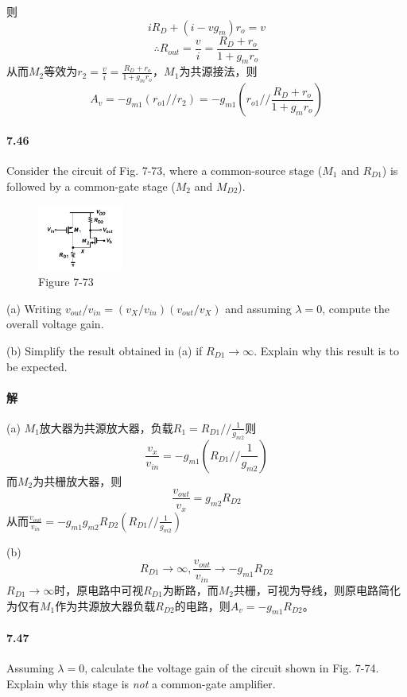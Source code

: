 \documentclass[hyperref, UTF8]{ctexart}
\newcommand{\under}[1]{\frac{1}{#1}}
\begin{document}
    则$$iR_D + (i - vg_m) r_o = v$$
    $$\therefore R_{out}=\frac{v}{i}=\frac{R_D+r_o}{1+g_mr_o}$$
    从而$M_2$等效为$r_2=\frac{v}{i}=\frac{R_D+r_o}{1+g_mr_o}$，$M_1$为共源接法，则
    $$A_v = -g_{m1}(r_{o1}//r_2) = -g_{m1}(r_{o1}//\frac{R_D+r_o}{1+g_mr_o})$$

\paragraph{7.46}\label{7.46}
    Consider the circuit of Fig. 7-73, where a common-source stage ($M_1$ and $R_{D1}$) is followed by a common-gate stage ($M_2$ and $M_{D2}$).

    \begin{figure}[!htb]
        \centering
        \includegraphics[width=0.249\textwidth]{p7-73.png}
        \caption*{Figure 7-73}
    \end{figure}
        
    (a) Writing $v_{out}/v_{in} = (v_X / v_{in})(v_{out}/v_X)$ and assuming $\lambda=0$, compute the overall voltage gain.

    (b) Simplify the result obtained in (a) if $R_{D1} \rightarrow \infty$. Explain why this result is to be expected.

\paragraph{解}

    (a) $M_1$放大器为共源放大器，负载$R_1=R_{D1}//\under{g_{m2}}$则
    $$\frac{v_x}{v_{in}}=-g_{m1}(R_{D1}//\under{g_{m2}})$$
    而$M_2$为共栅放大器，则
    $$\frac{v_{out}}{v_x}=g_{m2}R_{D2}$$
    从而$\frac{v_{out}}{v_{in}}=-g_{m1}g_{m2}R_{D2}(R_{D1}//\under{g_{m2}})$

    (b) $$R_{D1} \rightarrow \infty, \frac{v_{out}}{v_{in}} \rightarrow -g_{m1}R_{D2}$$
    $R_{D1} \rightarrow \infty$时，原电路中可视$R_{D1}$为断路，而$M_2$共栅，可视为导线，则原电路简化为仅有$M_1$作为共源放大器负载$R_{D2}$的电路，则$A_v = -g_{m1}R_{D2}$。

\paragraph{7.47} \label{7.47}
    Assuming $\lambda=0$, calculate the voltage gain of the circuit shown in Fig. 7-74. Explain why this stage is \emph{not} a common-gate amplifier. 
\end{document}
